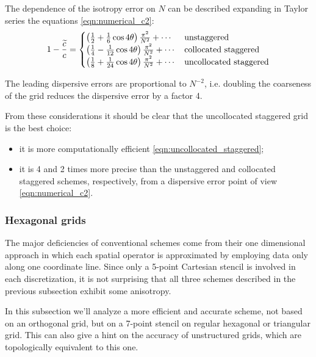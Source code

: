 The dependence of the isotropy error on $N$ can be described expanding
in Taylor series the equations \eqref{eqn:numerical_c2}:
\begin{equation*}
  1-\frac{\widetilde{c}}{c} = \begin{cases}
    \left( \frac{1}{2}  + \frac{1}{6} \cos 4\theta \right) \frac{\pi^2}{N^2} +
    \dotsb & \text{unstaggered} \\
    \left( \frac{1}{4}  - \frac{1}{12} \cos 4\theta \right) \frac{\pi^2}{N^2} +
    \dotsb & \text{collocated staggered} \\
    \left( \frac{1}{8}  + \frac{1}{24} \cos 4\theta \right) \frac{\pi^2}{N^2} +
    \dotsb & \text{uncollocated staggered}
    \end{cases}
\end{equation*}

The leading dispersive errors are proportional to $N^{-2}$,
i.e. doubling the coarseness of the grid reduces the dispersive error
by a factor 4.

From these considerations it should be clear that the uncollocated
staggered grid is the best choice:
\begin{itemize}
\item
  it is more computationally efficient
  \eqref{eqn:uncollocated_staggered};
\item
  it is 4 and 2 times more precise than the unstaggered and collocated
  staggered schemes, respectively, from a dispersive error point of
  view \eqref{eqn:numerical_c2}.
\end{itemize}

\subsubsection{Hexagonal grids}

The major deficiencies of conventional schemes come from their one
dimensional approach in which each spatial operator is approximated by
employing data only along one coordinate line. Since only a 5-point
Cartesian stencil is involved in each discretization, it is not
surprising that all three schemes described in the previous subsection
exhibit some anisotropy.

In this subsection we'll analyze a more efficient and accurate scheme,
not based on an orthogonal grid, but on a 7-point stencil on regular
hexagonal or triangular grid. This can also give a hint on the accuracy
of unstructured grids, which are topologically equivalent to this one.

